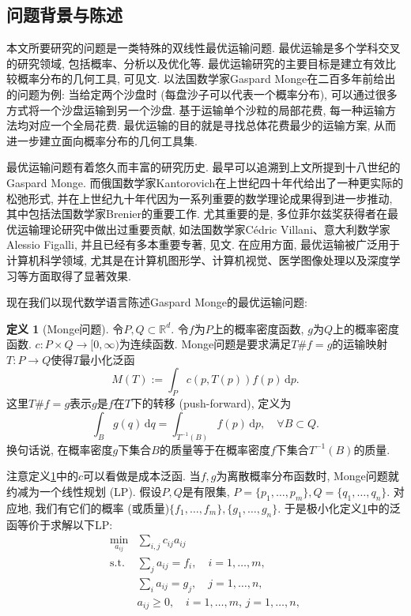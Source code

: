 \documentclass[UTF8,10.5pt,a4paper]{ctexart}
\theoremstyle{definition}
\theoremstyle{definition}
\newtheorem{dfn}{定义\hspace{0.05pt}}[section]
\newcommand{\st}{\mathrm{s.t.}}
\begin{document}
\subsection{问题背景与陈述}
本文所要研究的问题是一类特殊的双线性最优运输问题. 最优运输是多个学科交叉的研究领域, 包括概率、分析以及优化等. 最优运输研究的主要目标是建立有效比较概率分布的几何工具, 可见文\cite{Gu2017}. 以法国数学家Gaspard Monge在二百多年前给出的问题为例: 当给定两个沙盘时 (每盘沙子可以代表一个概率分布), 可以通过很多方式将一个沙盘运输到另一个沙盘. 基于运输单个沙粒的局部花费, 每一种运输方法均对应一个全局花费. 最优运输的目的就是寻找总体花费最少的运输方案, 从而进一步建立面向概率分布的几何工具集. 
\par 最优运输问题有着悠久而丰富的研究历史. 最早可以追溯到上文所提到十八世纪的Gaspard Monge. 而俄国数学家Kantorovich在上世纪四十年代给出了一种更实际的松弛形式, 并在上世纪九十年代因为一系列重要的数学理论成果得到进一步推动, 其中包括法国数学家Brenier的重要工作. 尤其重要的是, 多位菲尔兹奖获得者在最优运输理论研究中做出过重要贡献, 如法国数学家C\'edric Villani、意大利数学家Alessio Figalli, 并且已经有多本重要专著, 见文\cite{Villani2003Topics,Villani2008Optimal,Santambrogio2015Optimal,Peyre2019Computational}. 在应用方面, 最优运输被广泛用于计算机科学领域, 尤其是在计算机图形学、计算机视觉、医学图像处理以及深度学习等方面取得了显著效果.
\par 现在我们以现代数学语言陈述Gaspard Monge的最优运输问题:
\begin{dfn}[Monge问题]\label{monge}
	令$P,Q\subset\mathbb{R}^d$. 令$f$为$P$上的概率密度函数, $g$为$Q$上的概率密度函数. $c:P\times Q\to[0,\infty)$为连续函数. Monge问题是要求满足$T\#f=g$的运输映射$T:P\to Q$使得$T$最小化泛函
	$$M(T):=\int_Pc(p,T(p))f(p)\,\mathrm{d}p.$$
	这里$T\#f=g$表示$g$是$f$在$T$下的转移 (push-forward), 定义为
	$$\int_Bg(q)\,\mathrm{d}q=\int_{T^{-1}(B)}f(p)\,\mathrm{d}p,\quad\forall B\subset Q.$$换句话说, 在概率密度$g$下集合$B$的质量等于在概率密度$f$下集合$T^{-1}(B)$的质量.
\end{dfn}
注意定义\ref{monge}中的$c$可以看做是成本泛函. 当$f,g$为离散概率分布函数时, Monge问题就约减为一个线性规划 (LP). 假设$P,Q$是有限集, $P=\{p_1,\ldots,p_m\},Q=\{q_1,\ldots,q_n\}$. 对应地, 我们有它们的概率 (或质量)$\{f_1,\ldots,f_m\},\{g_1,\ldots,g_n\}$. 于是极小化定义\ref{monge}中的泛函等价于求解以下LP:
\begin{equation}
	\begin{array}{rl}
		\min\limits_{a_{ij}} & \sum\limits_{i,j}c_{ij}a_{ij}\\
		\st & \sum\limits_{j}a_{ij}=f_i,\quad i=1,\ldots,m,\\
		&\sum\limits_ia_{ij}=g_j,\quad j=1,\ldots,n,\\
		&a_{ij}\ge0,\quad i=1,\ldots,m,\,j=1,\ldots,n,
	\end{array}
	\label{monge LP}
\end{equation}
\end{document}
